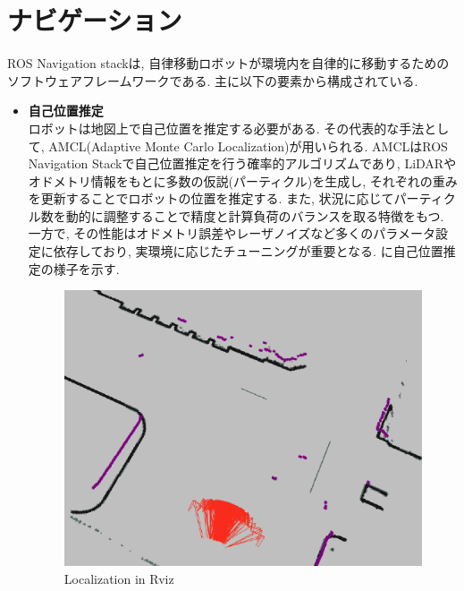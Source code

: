 \section{ナビゲーション}
ROS Navigation stack\cite{navstack}は, 自律移動ロボットが環境内を自律的に移動するためのソフトウェアフレームワークである. 主に以下の要素から構成されている. 
\begin{itemize}
     \item \textbf{自己位置推定}\\
     ロボットは地図上で自己位置を推定する必要がある. その代表的な手法として, AMCL(Adaptive Monte Carlo Localization)が用いられる. 
     AMCLはROS Navigation Stackで自己位置推定を行う確率的アルゴリズムであり, LiDARやオドメトリ情報をもとに多数の仮説(パーティクル)を生成し, 
     それぞれの重みを更新することでロボットの位置を推定する. また, 状況に応じてパーティクル数を動的に調整することで精度と計算負荷のバランスを取る特徴をもつ. 
     一方で, その性能はオドメトリ誤差やレーザノイズなど多くのパラメータ設定に依存しており, 実環境に応じたチューニングが重要となる. 
     に自己位置推定の様子を示す. 
     \begin{figure}[hbtp]
     \centering
          \includegraphics[keepaspectratio, scale=0.2]
           {images/amcl_example.png}
          \caption{Localization in Rviz}
          \label{Fig:lamcl_example}
     \end{figure}


\end{itemize}
